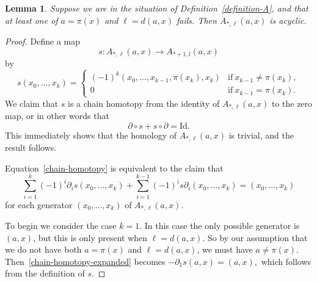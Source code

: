 \documentclass[10pt,a4paper]{amsart}
\newtheorem{lemma}{Lemma}
\begin{document}
\begin{lemma}\label{A-acyclic}
    Suppose we are in the situation of 
    Definition~\ref{definition-A},
    and that at least one of $a=\pi(x)$ and $\ell=d(a,x)$ fails.
    Then $A_{\ast,\ell}(a,x)$ is acyclic.
\end{lemma}

\begin{proof}
    Define a map
    \[
    	s\colon A_{\ast,\ell}(a,x)
            \longrightarrow A_{\ast+1,l}(a,x)
    \]
    by
    \[
    	s(x_0,\ldots,x_k) 
    	=
    	\begin{cases}
    		(-1)^k(x_0,\ldots,x_{k-1},\pi(x_k),x_k)
    		& \mathrm{if}\ x_{k-1}\neq\pi(x_k),
    		\\
    		0
    		&
    		\mathrm{if}\ x_{k-1}=\pi(x_k).
    	\end{cases}
    \]
    We claim that $s$ is a chain homotopy from the identity
    of $A_{\ast,\ell}(a,x)$ to the zero map,
    or in other words that
    \begin{equation}\label{chain-homotopy}
        \partial\circ s + s\circ\partial=\mathrm{Id}.
    \end{equation}
    This immediately shows that the homology 
    of $A_{\ast,\ell}(a,x)$ is trivial, and the result
    follows.
    
    Equation~\eqref{chain-homotopy} is equivalent to the claim
    that 
    \begin{equation}\label{chain-homotopy-expanded}
    	\sum_{i=1}^k (-1)^i \partial_i s(x_0,\ldots,x_k)
    	+ \sum_{i=1}^{k-1}(-1)^i s\partial_i(x_0,\ldots,x_k)
    	=(x_0,\ldots,x_k)
    \end{equation}
    for each generator $(x_0,\ldots,x_k)$ of $A_{\ast,\ell}(a,x)$.

    To begin we consider the case $k=1$.
    In this case  the only possible generator is $(a,x)$, 
    but this is only present when $\ell = d(a,x)$.
    So by our assumption that we do not have both
    $a=\pi(x)$ and $\ell = d(a,x)$, we must have $a\neq\pi(x)$.
    Then~\eqref{chain-homotopy-expanded} becomes
    $
        -\partial_1 s(a,x)
        =
        (a,x),
    $ 
    which follows from the definition of $s$. 


\end{proof}
\end{document}
